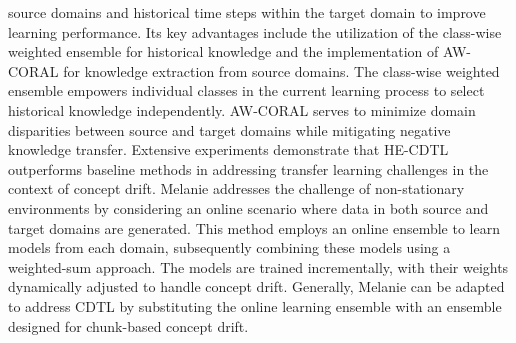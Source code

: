 source domains and historical time steps within the target domain to improve learning performance. Its key advantages include the utilization of the class-wise weighted ensemble for historical knowledge and the implementation of AW-CORAL for knowledge extraction from source domains. The class-wise weighted ensemble empowers individual classes in the current learning process to select historical knowledge independently. AW-CORAL serves to minimize domain disparities between source and target domains while mitigating negative knowledge transfer. Extensive experiments demonstrate that HE-CDTL outperforms baseline methods in addressing transfer learning challenges in the context of concept drift.
Melanie addresses the challenge of non-stationary environments by considering an online scenario where data in both source and target domains are generated. This method employs an online ensemble to learn models from each domain, subsequently combining these models using a weighted-sum approach. The models are trained incrementally, with their weights dynamically adjusted to handle concept drift. Generally, Melanie can be adapted to address CDTL by substituting the online learning ensemble with an ensemble designed for chunk-based concept drift.
